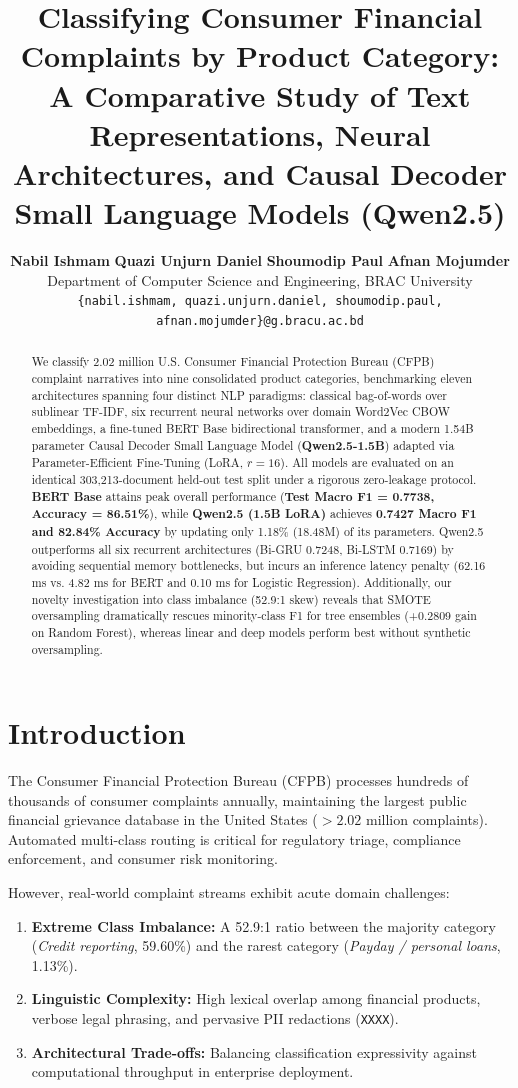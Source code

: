 \documentclass[11pt,a4paper,twocolumn]{article}
\title{\textbf{Classifying Consumer Financial Complaints by Product Category:\\A Comparative Study of Text Representations, Neural Architectures, and Causal Decoder Small Language Models (Qwen2.5)}}
\author{
  \textbf{Nabil Ishmam} \quad \textbf{Quazi Unjurn Daniel} \quad \textbf{Shoumodip Paul} \quad \textbf{Afnan Mojumder} \\
  Department of Computer Science and Engineering, BRAC University \\
  \texttt{\{nabil.ishmam, quazi.unjurn.daniel, shoumodip.paul, afnan.mojumder\}@g.bracu.ac.bd}
}
\date{}
\begin{document}
\maketitle

\begin{abstract}
We classify 2.02 million U.S. Consumer Financial Protection Bureau (CFPB) complaint narratives into nine consolidated product categories, benchmarking eleven architectures spanning four distinct NLP paradigms: classical bag-of-words over sublinear TF-IDF, six recurrent neural networks over domain Word2Vec CBOW embeddings, a fine-tuned BERT Base bidirectional transformer, and a modern 1.54B parameter Causal Decoder Small Language Model (\textbf{Qwen2.5-1.5B}) adapted via Parameter-Efficient Fine-Tuning (LoRA, $r=16$). All models are evaluated on an identical 303,213-document held-out test split under a rigorous zero-leakage protocol. \textbf{BERT Base} attains peak overall performance (\textbf{Test Macro F1 = 0.7738, Accuracy = 86.51\%}), while \textbf{Qwen2.5 (1.5B LoRA)} achieves \textbf{0.7427 Macro F1 and 82.84\% Accuracy} by updating only 1.18\% (18.48M) of its parameters. Qwen2.5 outperforms all six recurrent architectures (Bi-GRU 0.7248, Bi-LSTM 0.7169) by avoiding sequential memory bottlenecks, but incurs an inference latency penalty (62.16 ms vs. 4.82 ms for BERT and 0.10 ms for Logistic Regression). Additionally, our novelty investigation into class imbalance (52.9:1 skew) reveals that SMOTE oversampling dramatically rescues minority-class F1 for tree ensembles (+0.2809 gain on Random Forest), whereas linear and deep models perform best without synthetic oversampling.
\end{abstract}

\section{Introduction}
The Consumer Financial Protection Bureau (CFPB) processes hundreds of thousands of consumer complaints annually, maintaining the largest public financial grievance database in the United States ($>2.02$ million complaints). Automated multi-class routing is critical for regulatory triage, compliance enforcement, and consumer risk monitoring. 

However, real-world complaint streams exhibit acute domain challenges:
\begin{enumerate}
    \item \textbf{Extreme Class Imbalance:} A 52.9:1 ratio between the majority category (\textit{Credit reporting}, 59.60\%) and the rarest category (\textit{Payday / personal loans}, 1.13\%).
    \item \textbf{Linguistic Complexity:} High lexical overlap among financial products, verbose legal phrasing, and pervasive PII redactions (\texttt{XXXX}).
    \item \textbf{Architectural Trade-offs:} Balancing classification expressivity against computational throughput in enterprise deployment.
\end{enumerate}
\end{document}
